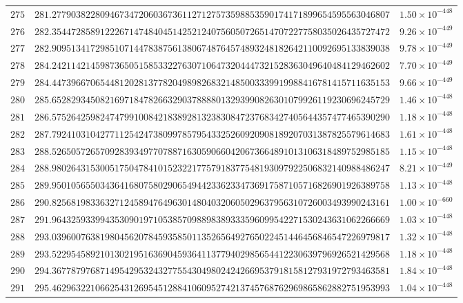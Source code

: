 \documentclass[12pt,reqno]{amsart}
\theoremstyle{remark}
\begin{document}
\begin{longtable}{clc}
$275$ & $281.2779038228094673472060367361127127573598853590174171899654595563046807$ & $1.50\times 10^{-448}$ \\
$276$ & $282.3544728589122267147484045142521240756050726514707227758035026435727472$ & $9.26\times 10^{-449}$ \\
$277$ & $282.9095134172985107144783875613806748764574893248182642110092695133839038$ & $9.78\times 10^{-449}$ \\
$278$ & $284.2421142145987365051585332276307106473204447321528363049640484129462602$ & $7.70\times 10^{-449}$ \\
$279$ & $284.4473966706544812028137782049898268321485003339919988416781415711635153$ & $9.66\times 10^{-449}$ \\
$280$ & $285.6528293450821697184782663290378888013293990826301079926119230696245729$ & $1.46\times 10^{-448}$ \\
$281$ & $286.5752642598247479910084218389281323830847237683427405644357477465390290$ & $1.18\times 10^{-448}$ \\
$282$ & $287.7924103104277112542473809978579543325260920908189207031387825579614683$ & $1.61\times 10^{-448}$ \\
$283$ & $288.5265057265709283934977078871630590660420673664891013106318489752985185$ & $1.15\times 10^{-448}$ \\
$284$ & $288.9802643153005175047841015232217757918377548193097922506832140988486247$ & $8.21\times 10^{-449}$ \\
$285$ & $289.9501056550343641680758029065494423362334736917587105716826901926389758$ & $1.13\times 10^{-448}$ \\
$286$ & $290.8256819833632712458947649630148040320605029637956310726003493990243161$ & $1.00\times 10^{-660}$ \\
$287$ & $291.9643259339943530901971053857098898389333596099542271530243631062266669$ & $1.03\times 10^{-448}$ \\
$288$ & $293.0396007638198045620784593585011352656492765022451446456846547226979817$ & $1.32\times 10^{-448}$ \\
$289$ & $293.5229545892101302195163690459364113779402985654412230639796926521429568$ & $1.18\times 10^{-448}$ \\
$290$ & $294.3677879768714954295324327755430498024242669537918158127931972793463581$ & $1.84\times 10^{-448}$ \\
$291$ & $295.4629632210662543126954512884106095274213745768762969865862882751953993$ & $1.04\times 10^{-448}$ \\

\end{longtable}
\end{document}
